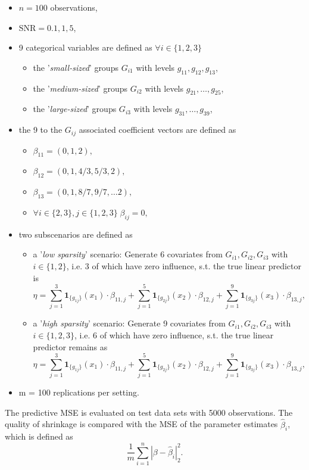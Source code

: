 \documentclass[12pt,letterpaper]{article}
\numberwithin{equation}{subsection}
\begin{document}
\begin{itemize}
\item $n = 100$ observations,
\item $\text{SNR} = 0.1, 1, 5$,
\item 9 categorical variables are defined as $\forall i \in \{1,2,3\}$
\begin{itemize}
\item the '\textit{small-sized}' groups $G_{i1}$ with levels $g_{11},g_{12},g_{13}$,
\item the '\textit{medium-sized}' groups $G_{i2}$ with levels $g_{21},\dots,g_{25}$,
\item the '\textit{large-sized}' groups $G_{i3}$ with levels $g_{31},\dots,g_{39}$,
\end{itemize}
\item the 9 to the $G_{ij}$ associated coefficient vectors are defined as
\begin{itemize}
\item $\beta_{11} = (0,1,2),$ 
\item $\beta_{12} = (0,1,4/3,5/3,2),$ 
\item $\beta_{13} = (0,1,8/7,9/7,\dots2),$ 
\item $\forall i \in \{2,3\}, j \in \{1,2,3\} \;\beta_{ij} = 0,$ 
\end{itemize}
\item two subscenarios are defined as
\begin{itemize}
\item a '\textit{low sparsity}' scenario: Generate 6 covariates from $G_{i1},G_{i2},G_{i3}$ with $i \in \{1,2\}$, i.e. 3 of which have zero influence, s.t. the true linear predictor is 
\begin{equation*}
\eta = \sum^3_{j=1}\mathbf{1}_{\{g_{1j}\}}(x_1) \cdot \beta_{11,j} +  \sum^5_{j=1}\mathbf{1}_{\{g_{2j}\}}(x_2) \cdot \beta_{12,j} +  
\sum^9_{j=1}\mathbf{1}_{\{g_{3j}\}}(x_3) \cdot \beta_{13,j},
\end{equation*}
\item a '\textit{high sparsity}' scenario: Generate 9 covariates from $G_{i1},G_{i2},G_{i3}$ with $i \in \{1,2,3\}$, i.e. 6 of which have zero influence, s.t. the true linear predictor remains as
\begin{equation*}
\eta = \sum^3_{j=1}\mathbf{1}_{\{g_{1j}\}}(x_1) \cdot \beta_{11,j} +  \sum^5_{j=1}\mathbf{1}_{\{g_{2j}\}}(x_2) \cdot \beta_{12,j} +  
\sum^9_{j=1}\mathbf{1}_{\{g_{3j}\}}(x_3) \cdot \beta_{13,j},
\end{equation*}
\end{itemize}
\item m = 100 replications per setting.
\end{itemize}
The predictive MSE is evaluated on test data sets with 5000 observations. The quality of shrinkage is compared with the MSE of the parameter estimates $\hat{\beta}_i$, which is defined as
\[
\frac{1}{m}\sum^n_{i=1}|\beta - \hat{\beta}_i|^2_2.
\]
\end{document}

